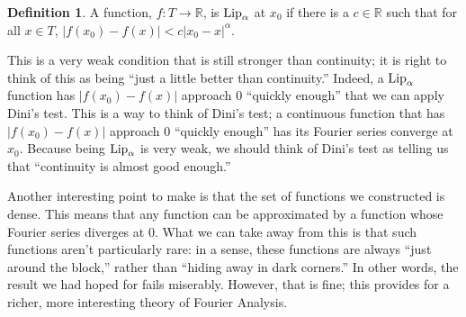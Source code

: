 \documentclass{amsart}
\newcommand{\al}{\alpha} %
\newcommand{\R}{\mathbb{R}}
\newcommand{\Lip}{\text{\rm Lip}}
\newcommand{\absval}[1]{\left| #1 \right|}
\theoremstyle{definition}
\newtheorem{definition}[thm]{Definition}
\begin{document}
\begin{definition}
A function, $f: T \to \R$, is $\Lip_\al$ at $x_0$ if there is a $c \in \R$ such that for all $x \in T$, $\absval{f(x_0) - f(x)} < c\absval{x_0-x}^\al$. 
\end{definition}

This is a very weak condition that is still stronger than continuity; it is right to think of this as being ``just a little better than continuity.''
Indeed, a $\Lip_\al$ function has $\absval{f(x_0) - f(x)}$ approach $0$ ``quickly enough'' that we can apply Dini's test.
This is a way to think of Dini's test; a continuous function that has $\absval{f(x_0) - f(x)}$ approach $0$ ``quickly enough'' has its Fourier series converge at $x_0$. 
Because being $\Lip_\al$ is very weak, we should think of Dini's test as telling us that ``continuity is almost good enough.''


Another interesting point to make is that the set of functions we constructed is dense. 
This means that any function can be approximated by a function whose Fourier series diverges at $0$. 
What we can take away from this is that such functions aren't particularly rare: in a sense, these functions are always ``just around the block,'' rather than ``hiding away in dark corners.''
In other words, the result we had hoped for fails miserably. 
However, that is fine; this provides for a richer, more interesting theory of Fourier Analysis.



\end{document}
